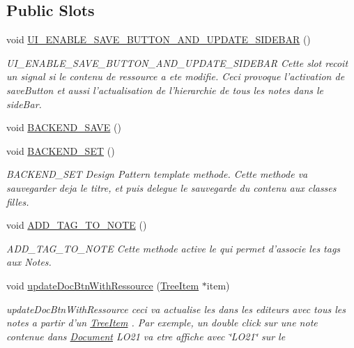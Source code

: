 \subsection*{Public Slots}
\begin{DoxyCompactItemize}
\item 
void \hyperlink{class_editor_a5c63fc734e4dae035bd4d2bf44cba4d8}{U\-I\-\_\-\-E\-N\-A\-B\-L\-E\-\_\-\-S\-A\-V\-E\-\_\-\-B\-U\-T\-T\-O\-N\-\_\-\-A\-N\-D\-\_\-\-U\-P\-D\-A\-T\-E\-\_\-\-S\-I\-D\-E\-B\-A\-R} ()
\begin{DoxyCompactList}\small\item\em U\-I\-\_\-\-E\-N\-A\-B\-L\-E\-\_\-\-S\-A\-V\-E\-\_\-\-B\-U\-T\-T\-O\-N\-\_\-\-A\-N\-D\-\_\-\-U\-P\-D\-A\-T\-E\-\_\-\-S\-I\-D\-E\-B\-A\-R Cette slot recoit un signal si le contenu de ressource a ete modifie. Ceci provoque l'activation de save\-Button et aussi l'actualisation de l'hierarchie de tous les notes dans le side\-Bar. \end{DoxyCompactList}\item 
void \hyperlink{class_editor_a5b255fef573f1c804019ea58b0a35b58}{B\-A\-C\-K\-E\-N\-D\-\_\-\-S\-A\-V\-E} ()
\item 
void \hyperlink{class_editor_a081375df74bcabc9d5671faf4f64fb7c}{B\-A\-C\-K\-E\-N\-D\-\_\-\-S\-E\-T} ()
\begin{DoxyCompactList}\small\item\em B\-A\-C\-K\-E\-N\-D\-\_\-\-S\-E\-T Design Pattern template methode. Cette methode va sauvegarder deja le titre, et puis delegue le sauvegarde du contenu aux classes filles. \end{DoxyCompactList}\item 
void \hyperlink{class_editor_aecaabc81c4e8414088cffd1fba4ed962}{A\-D\-D\-\_\-\-T\-A\-G\-\_\-\-T\-O\-\_\-\-N\-O\-T\-E} ()
\begin{DoxyCompactList}\small\item\em A\-D\-D\-\_\-\-T\-A\-G\-\_\-\-T\-O\-\_\-\-N\-O\-T\-E Cette methode active le  qui permet d'associe les tags aux Notes. \end{DoxyCompactList}\item 
void \hyperlink{class_editor_a2659996c89fae79d873bb8c2b0cde432}{update\-Doc\-Btn\-With\-Ressource} (\hyperlink{class_tree_item}{Tree\-Item} $\ast$item)
\begin{DoxyCompactList}\small\item\em update\-Doc\-Btn\-With\-Ressource ceci va actualise les  dans les editeurs avec tous les notes a partir d'un \hyperlink{class_tree_item}{Tree\-Item} . Par exemple, un double click sur une note contenue dans \hyperlink{class_document}{Document} L\-O21 va etre affiche avec \char`\"{}\-L\-O21\char`\"{} sur le  \end{DoxyCompactList}\item 

\end{DoxyCompactItemize}
